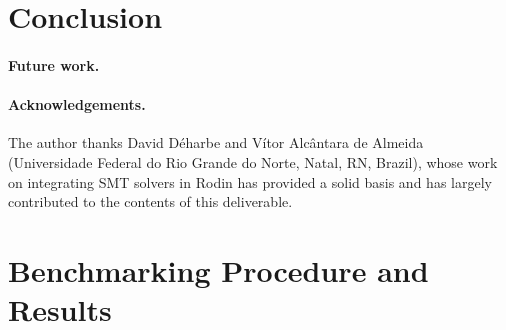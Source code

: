 \documentclass[10pt,a4paper]{report}
\begin{document}





\section{Conclusion}

\paragraph{Future work.} 

\paragraph{Acknowledgements.} 
The author thanks David D\'eharbe and V\'itor Alc\^antara de Almeida (Universidade Federal do Rio Grande do Norte, Natal, RN, Brazil), whose work on integrating SMT solvers in Rodin \cite{RODINSMT10} has provided a solid basis and has largely contributed to the contents of this deliverable.

\nocite{*}



\appendix
\makeatletter
\def\@seccntformat#1{Appendix~\csname the#1\endcsname:\quad}
\makeatother
\section{Benchmarking Procedure and Results}
\label{Bench}

     
\end{document}
